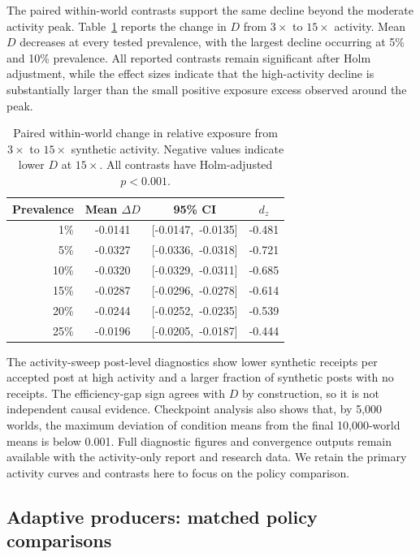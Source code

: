 \documentclass[runningheads]{llncs}
\begin{document}
The paired within-world contrasts support the same decline beyond the moderate activity peak. Table~\ref{tab:paired_3x_15x} reports the change in \(D\) from \(3\times\) to \(15\times\) activity. Mean \(D\) decreases at every tested prevalence, with the largest decline occurring at 5\% and 10\% prevalence. All reported contrasts remain significant after Holm adjustment, while the effect sizes indicate that the high-activity decline is substantially larger than the small positive exposure excess observed around the peak.

\begin{table}[t]
    \centering
    \caption{Paired within-world change in relative exposure from
    \(3\times\) to \(15\times\) synthetic activity. Negative values indicate
    lower \(D\) at \(15\times\). All contrasts have Holm-adjusted
    \(p<0.001\).}
    \label{tab:paired_3x_15x}
    \begin{tabular}{rccc}
    \hline
    Prevalence & Mean \(\Delta D\) & 95\% CI & \(d_z\) \\
    \hline
    1\%  & -0.0141 & [-0.0147, \,-0.0135] & -0.481 \\
    5\%  & -0.0327 & [-0.0336, \,-0.0318] & -0.721 \\
    10\% & -0.0320 & [-0.0329, \,-0.0311] & -0.685 \\
    15\% & -0.0287 & [-0.0296, \,-0.0278] & -0.614 \\
    20\% & -0.0244 & [-0.0252, \,-0.0235] & -0.539 \\
    25\% & -0.0196 & [-0.0205, \,-0.0187] & -0.444 \\
    \hline
    \end{tabular}
\end{table}

The activity-sweep post-level diagnostics show lower synthetic receipts per accepted post at high activity and a larger fraction of synthetic posts with no receipts. The efficiency-gap sign agrees with \(D\) by construction, so it is not independent causal evidence. Checkpoint analysis also shows that, by 5,000 worlds, the maximum deviation of condition means from the final 10,000-world means is below 0.001. Full diagnostic figures and convergence outputs remain available with the activity-only report and research data. We retain the primary activity curves and contrasts here to focus on the policy comparison.

\subsection{Adaptive producers: matched policy comparisons}
\label{sec:adaptive-results}
\end{document}
